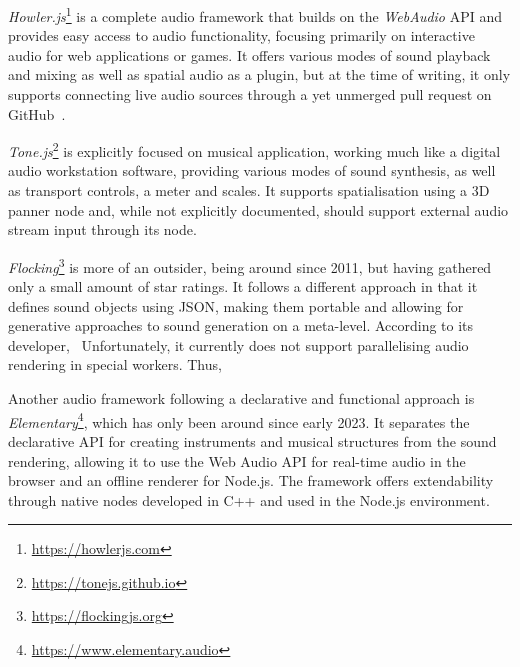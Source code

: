 

\emph{Howler.js}\footnote{\url{https://howlerjs.com}} is a complete audio framework that builds on the \emph{WebAudio} \ac{API} and provides easy access to audio functionality, focusing primarily on interactive audio for web applications or games.
It offers various modes of sound playback and mixing as well as spatial audio as a plugin, but at the time of writing, it only supports connecting live audio sources through a yet unmerged pull request on GitHub~\parencite{githubHowlerPullRequest}.

\emph{Tone.js}\footnote{\url{https://tonejs.github.io}} is explicitly focused on musical application, working much like a digital audio workstation software, providing various modes of sound synthesis, as well as transport controls, a meter and scales.
It supports spatialisation using a \ac{3D} panner node and, while not explicitly documented, should support external audio stream input through its  node.

\emph{Flocking}\footnote{\url{https://flockingjs.org}} is more of an outsider, being around since 2011, but having gathered only a small amount of star ratings.
It follows a different approach in that it defines sound objects using \ac{JSON}, making them portable and allowing for generative approaches to sound generation on a meta-level.
According to its developer,~ Unfortunately, it currently does not support parallelising audio rendering in special workers.
Thus,~

Another audio framework following a declarative and functional approach is \emph{Elementary}\footnote{\url{https://www.elementary.audio}}, which has only been around since early 2023.
It separates the declarative \ac{API} for creating instruments and musical structures from the sound rendering, allowing it to use the Web Audio \ac{API} for real-time audio in the browser and an offline renderer for Node.js.
The framework offers extendability through native nodes developed in C++ and used in the Node.js environment.

